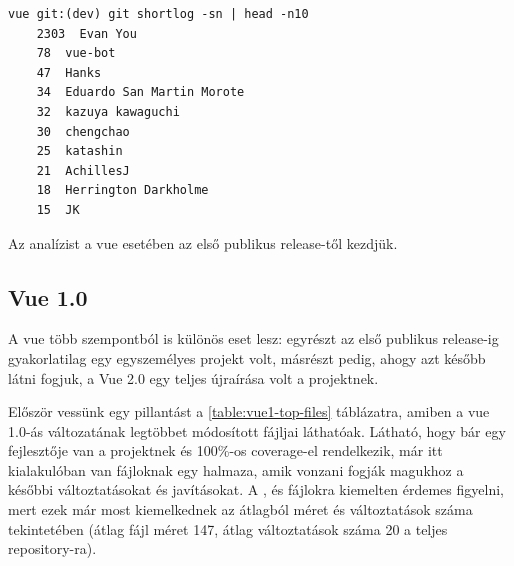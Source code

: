 \begin{lstlisting}
vue git:(dev) git shortlog -sn | head -n10
    2303  Evan You
    78  vue-bot
    47  Hanks
    34  Eduardo San Martin Morote
    32  kazuya kawaguchi
    30  chengchao
    25  katashin
    21  AchillesJ
    18  Herrington Darkholme
    15  JK
\end{lstlisting}

Az analízist a vue esetében az első publikus release-től kezdjük.
\pagebreak

\subsection{Vue 1.0}

A vue több szempontból is különös eset lesz: egyrészt az első publikus release-ig gyakorlatilag egy egyszemélyes projekt volt, másrészt pedig, ahogy azt később látni fogjuk, a Vue 2.0 egy teljes újraírása volt a projektnek.

Először vessünk egy pillantást a \ref{table:vue1-top-files} táblázatra, amiben a vue 1.0-ás változatának legtöbbet módosított fájljai láthatóak. Látható, hogy bár egy fejlesztője van a projektnek és 100\%-os coverage-el rendelkezik, már itt kialakulóban van fájloknak egy halmaza, amik vonzani fogják magukhoz a későbbi változtatásokat és javításokat. A ,  és  fájlokra kiemelten érdemes figyelni, mert ezek már most kiemelkednek az átlagból méret és változtatások száma tekintetében (átlag fájl méret 147, átlag változtatások száma 20 a teljes repository-ra).

